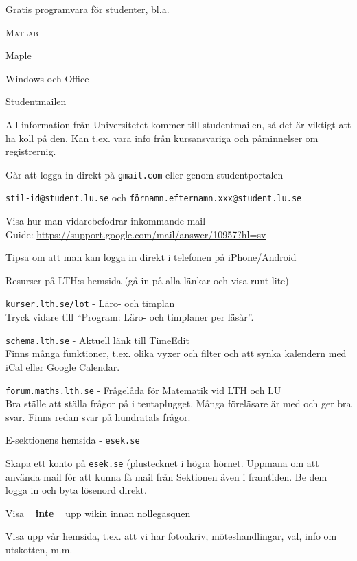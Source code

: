 \documentclass[10pt]{article}
\begin{document}
\begin{dashlist}
\begin{dashlist}
			\item Gratis programvara för studenter, bl.a.
			\begin{dashlist}
				\item \textsc{Matlab}
				\item Maple
				\item Windows och Office
			\end{dashlist}
		\end{dashlist}

		\item Studentmailen
		\begin{dashlist}
			\item All information från Universitetet kommer till studentmailen, så det är viktigt att ha koll på den. Kan t.ex. vara info från kursansvariga och påminnelser om registrernig.
			\item Går att logga in direkt på \texttt{gmail.com} eller genom studentportalen
			\item \texttt{stil-id@student.lu.se} och \texttt{förnamn.efternamn.xxx@student.lu.se}
			\item Visa hur man vidarebefodrar inkommande mail\\
			Guide: \url{https://support.google.com/mail/answer/10957?hl=sv}
			\item Tipsa om att man kan logga in direkt i telefonen på iPhone/Android
		\end{dashlist}

		\item Resurser på LTH:s hemsida (gå in på alla länkar och visa runt lite)
		\begin{dashlist}
			\item \texttt{kurser.lth.se/lot} - Läro- och timplan\\
				Tryck vidare till ``Program: Läro- och timplaner per läsår''.
			\item \texttt{schema.lth.se} - Aktuell länk till TimeEdit\\
				Finns många funktioner, t.ex. olika vyxer och filter och att synka kalendern med iCal eller Google Calendar.
			\item \texttt{forum.maths.lth.se} - Frågelåda för Matematik vid LTH och LU\\
				Bra ställe att ställa frågor på i tentaplugget. Många föreläsare är med och ger bra svar. Finns redan svar på hundratals frågor.
		\end{dashlist}

		\newpage

		\item E-sektionens hemsida - \texttt{esek.se}
		\begin{dashlist}
			\item Skapa ett konto på \texttt{esek.se} (plustecknet i högra hörnet. Uppmana om att använda mail för att kunna få mail från Sektionen även i framtiden. Be dem logga in och byta lösenord direkt.
			\item Visa \textbf{\_inte\_} upp wikin innan nollegasquen
			\item Visa upp vår hemsida, t.ex. att vi har fotoakriv, möteshandlingar, val, info om utskotten, m.m.
		\end{dashlist}


\end{dashlist}
\end{document}
